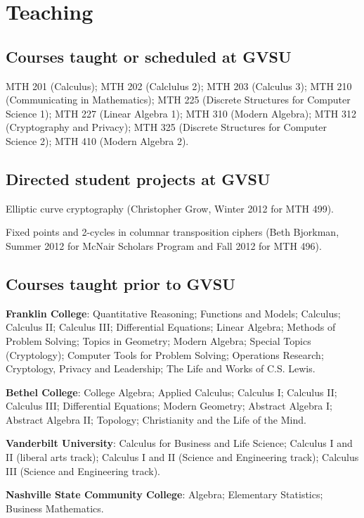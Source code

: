 \documentclass[letterpaper]{article}
\renewenvironment{itemize}{
  \begin{list}{}{
    \setlength{\leftmargin}{1.5em}
	\setlength{\itemsep}{0in}
  }
}{
  \end{list}
}
\begin{document}
\section*{Teaching}

\subsection*{Courses taught or scheduled at GVSU}
MTH 201 (Calculus); MTH 202 (Calclulus 2); MTH 203 (Calculus 3); MTH 210 (Communicating in Mathematics); MTH 225 (Discrete Structures for Computer Science 1); MTH 227 (Linear Algebra 1); MTH 310 (Modern Algebra); MTH 312 (Cryptography and Privacy); MTH 325 (Discrete Structures for Computer Science 2); MTH 410 (Modern Algebra 2). 
 

\subsection*{Directed student projects at GVSU}
\begin{itemize}
	\item Elliptic curve cryptography (Christopher Grow, Winter 2012 for MTH 499).
	\item Fixed points and 2-cycles in columnar transposition ciphers (Beth Bjorkman, Summer 2012 for McNair Scholars Program and Fall 2012 for MTH 496). 
\end{itemize}


\subsection*{Courses taught prior to GVSU}

\begin{itemize}
	\item \textbf{Franklin College}: Quantitative Reasoning; Functions and Models; Calculus; Calculus II; Calculus III; Differential Equations; Linear Algebra; Methods of Problem Solving; Topics in Geometry; Modern Algebra; Special Topics (Cryptology); Computer Tools for Problem Solving; Operations Research; Cryptology, Privacy and Leadership; The Life and Works of C.S. Lewis.  
	\item \textbf{Bethel College}: College Algebra; Applied Calculus; Calculus I; Calculus II; Calculus III; Differential Equations; Modern Geometry; Abstract Algebra I; Abstract Algebra II; Topology; Christianity and the Life of the Mind. 
	\item \textbf{Vanderbilt University}: Calculus for Business and Life Science; Calculus I and II (liberal arts track); Calculus I and II (Science and Engineering track); Calculus III (Science and Engineering track). 
	\item \textbf{Nashville State Community College}: Algebra; Elementary Statistics; Business Mathematics. 
\end{itemize}
\end{document}
